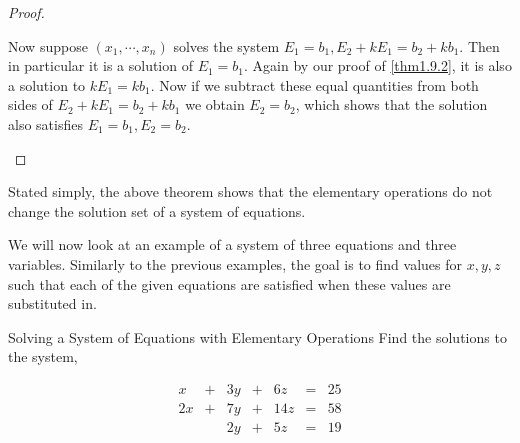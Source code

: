 \begin{proof}
\begin{enumerate}
Now suppose $\left( x_{1},\cdots ,x_{n}\right)$  solves the system 
$E_{1}=b_{1}, E_{2}+kE_{1}=b_{2}+kb_{1}$. Then in particular it is a solution of $E_{1} = b_{1}$. Again by our proof of \ref{thm1.9.2},
 it is also a solution to $kE_{1}=kb_{1}$. Now if we subtract these equal quantities from both sides of 
$E_{2}+kE_{1}=b_{2}+kb_{1}$ we obtain $E_{2}=b_{2}$, which shows that the solution also satisfies
$E_{1}=b_{1},E_{2}=b_{2}.$ 
\end{enumerate}
\end{proof}
\fi
Stated simply, the above theorem shows that the elementary operations do not
change the solution set of a system of equations.

We will now look at an example of a system of three equations and three variables.
Similarly to the previous examples, the goal is to find values for $x,y,z$ such that each of the given equations
are satisfied when these values are substituted in.

\begin{example}{ Solving a System of Equations with Elementary Operations}\label{exa:solvingasystemwithelementaryops}
Find the solutions to the system,

\begin{equation}
\begin{array}{ccccccc}
x&+&3y&+&6z&=&25 \\
2x&+&7y&+&14z&=&58 \\
&&2y&+&5z&=&19
\end{array}
\label{solvingasystem1}
\end{equation}
\end{example}

